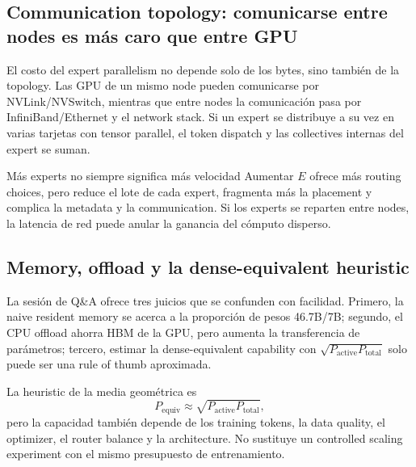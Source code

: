 \documentclass[a4paper]{article}
\begin{document}

\subsection{Communication topology: comunicarse entre nodes es más caro que entre GPU}

El costo del expert parallelism no depende solo de los bytes, sino también de la topology. Las GPU de un mismo node pueden comunicarse por NVLink/NVSwitch, mientras que entre nodes la comunicación pasa por InfiniBand/Ethernet y el network stack. Si un expert se distribuye a su vez en varias tarjetas con tensor parallel, el token dispatch y las collectives internas del expert se suman.

\begin{warningbox}{Más experts no siempre significa más velocidad}
Aumentar $E$ ofrece más routing choices, pero reduce el lote de cada expert, fragmenta más la placement y complica la metadata y la communication. Si los experts se reparten entre nodes, la latencia de red puede anular la ganancia del cómputo disperso.
\end{warningbox}


\subsection{Memory, offload y la dense-equivalent heuristic}

La sesión de Q\&A ofrece tres juicios que se confunden con facilidad. Primero, la naive resident memory se acerca a la proporción de pesos 46.7B/7B; segundo, el CPU offload ahorra HBM de la GPU, pero aumenta la transferencia de parámetros; tercero, estimar la dense-equivalent capability con $\sqrt{P_{\text{active}}P_{\text{total}}}$ solo puede ser una rule of thumb aproximada.

La heuristic de la media geométrica es
\[
P_{\text{equiv}}\approx \sqrt{P_{\text{active}}P_{\text{total}}},
\]
pero la capacidad también depende de los training tokens, la data quality, el optimizer, el router balance y la architecture. No sustituye un controlled scaling experiment con el mismo presupuesto de entrenamiento.
\end{document}
